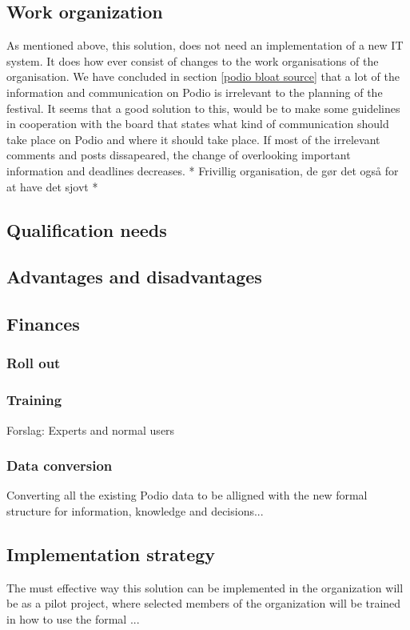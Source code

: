 \subsection{Work organization}
As mentioned above, this solution, does not need an implementation of a new IT system. It does how
ever consist of changes to the work organisations of the organisation. 
We have concluded in section \ref{podio bloat source} that a lot of the information and
communication on Podio is irrelevant to the planning of the festival. It seems that a good solution
to this, would be to make some guidelines in cooperation with the board that states what kind of
communication should take place on Podio and where it should take place. If most of the irrelevant
comments and posts dissapeared, the change of overlooking important information and deadlines
decreases. 
* Frivillig organisation, de gør det også for at have det sjovt
* 

\subsection{Qualification needs}

\subsection{Advantages and disadvantages}

\subsection{Finances}

\subsubsection{Roll out}

\subsubsection{Training}
Forslag: Experts and normal users
\subsubsection{Data conversion}
Converting all the existing Podio data to be alligned with the new formal structure for information, knowledge and decisions...

\subsection{Implementation strategy}
The must effective way this solution can be implemented in the organization will be as a pilot project, where selected members of the organization will be trained in how to use the formal ... 



